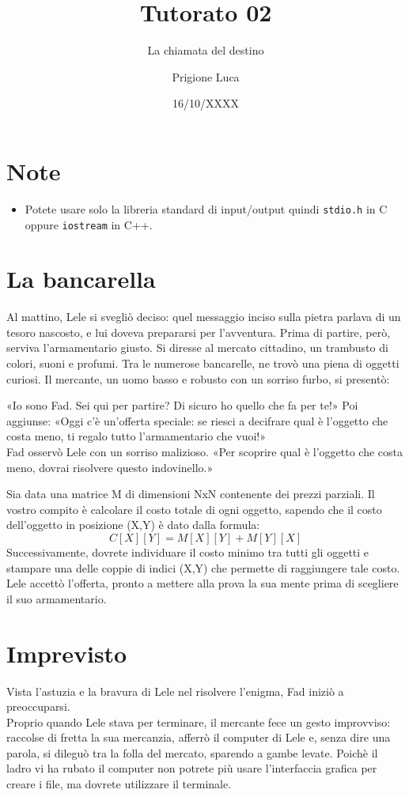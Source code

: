 \documentclass[a4paper]{article}
\title{Tutorato 02}
\subtitle{La chiamata del destino}
\author{Prigione Luca}
\date{16/10/XXXX}
\begin{document}
\pagestyle{empty}

\maketitle

\section*{Note}
  \begin{itemize}
    \item Potete usare solo la libreria standard di input/output quindi \texttt{stdio.h} in C oppure \texttt{iostream} in C++.
  \end{itemize}

\section*{La bancarella}
Al mattino, Lele si svegliò deciso: quel messaggio inciso sulla pietra parlava di un tesoro nascosto, e lui doveva prepararsi per l'avventura. Prima di partire, però, serviva l'armamentario giusto.
Si diresse al mercato cittadino, un trambusto di colori, suoni e profumi. Tra le numerose bancarelle, ne trovò una piena di oggetti curiosi.
Il mercante, un uomo basso e robusto con un sorriso furbo, si presentò:

«Io sono Fad. Sei qui per partire? Di sicuro ho quello che fa per te!»
Poi aggiunse: «Oggi c'è un'offerta speciale: se riesci a decifrare qual è l'oggetto che costa meno, ti regalo tutto l'armamentario che vuoi!»\\
Fad osservò Lele con un sorriso malizioso. «Per scoprire qual è l'oggetto che costa meno, dovrai risolvere questo indovinello.»

Sia data una matrice M di dimensioni NxN contenente dei prezzi parziali.
Il vostro compito è calcolare il costo totale di ogni oggetto, sapendo che il costo dell'oggetto in posizione (X,Y) è dato dalla formula:
\begin{equation*}C[X][Y]=M[X][Y]+M[Y][X]\end{equation*}
Successivamente, dovrete individuare il costo minimo tra tutti gli oggetti e stampare una delle coppie di indici (X,Y) che permette di raggiungere tale costo.\\
Lele accettò l'offerta, pronto a mettere alla prova la sua mente prima di scegliere il suo armamentario.

\section*{Imprevisto}
Vista l'astuzia e la bravura di Lele nel risolvere l'enigma, Fad iniziò a preoccuparsi.\\
Proprio quando Lele stava per terminare, il mercante fece un gesto improvviso: raccolse di fretta la sua mercanzia, afferrò il computer di Lele e, senza dire una parola, si dileguò tra la folla del mercato, sparendo a gambe levate.
Poichè il ladro vi ha rubato il computer non potrete più usare l'interfaccia grafica per creare i file, ma dovrete utilizzare il terminale.
\end{document}
